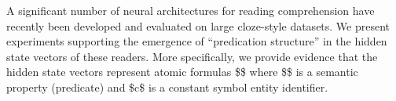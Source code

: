 A significant number of neural architectures for reading comprehension have recently been developed and evaluated on large cloze-style datasets. We present experiments supporting the emergence of ``predication structure'' in the hidden state vectors of these readers.  More specifically, we provide evidence that the hidden state vectors represent atomic formulas \$\Phi[c]\$ where \$\Phi\$ is a semantic property (predicate) and \$c\$ is a constant symbol entity identifier.
